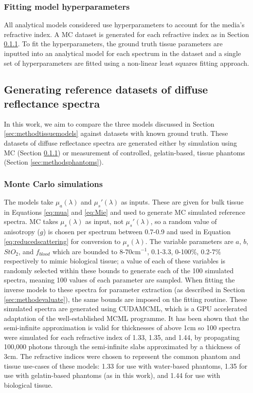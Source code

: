 \subsubsection{Fitting model hyperparameters}
All analytical models considered use hyperparameters to account for the media's refractive index. A MC dataset is generated for each refractive index as in Section \ref{sec:methodsMC}. To fit the hyperparameters, the ground truth tissue parameters are inputted into an analytical model for each spectrum in the dataset and a single set of hyperparameters are fitted using a non-linear least squares fitting approach.

\subsection{Generating reference datasets of diffuse reflectance spectra}\label{sec:methodreference}
In this work, we aim to compare the three models discussed in Section \ref{sec:methodtissuemodels} against datasets with known ground truth. These datasets of diffuse reflectance spectra are generated either by simulation using MC (Section \ref{sec:methodsMC}) or measurement of controlled, gelatin-based, tissue phantoms (Section \ref{sec:methodsphantoms}).

\subsubsection{Monte Carlo simulations}\label{sec:methodsMC}
The models take $\mu_a(\lambda)$ and $\mu_s'(\lambda)$ as inputs. These are given for bulk tissue in Equations \eqref{eq:mua} and \eqref{eq:Mie} and used to generate MC simulated reference spectra. MC takes $\mu_s(\lambda)$ as input, not $\mu_s'(\lambda)$, so a random value of anisotropy ($g$) is chosen per spectrum between 0.7-0.9\cite{Yudovsky2009} and used in Equation \eqref{eq:reducedscattering} for conversion to $\mu_s(\lambda)$. The variable parameters are $a$, $b$, $StO_2$, and $f_{blood}$ which are bounded to 8-70cm\textrm{$^{-1}$}, 0.1-3.3, 0-100\%, 0.2-7\% respectively to mimic biological tissue\cite{Yudovsky2009, Jacques2013}; a value of each of these variables is randomly selected within these bounds to generate each of the 100 simulated spectra, meaning 100 values of each parameter are sampled. When fitting the inverse models to these spectra for parameter extraction (as described in Section \ref{sec:methodevaluate}), the same bounds are imposed on the fitting routine. These simulated spectra are generated using CUDAMCML\cite{Alerstam2008}, which is a GPU accelerated adaptation of the well-established MCML programme\cite{Wang1995}. It has been shown that the semi-infinite approximation is valid for thicknesses of above 1cm\cite{Zhang2014} so 100 spectra were simulated for each refractive index of 1.33, 1.35, and 1.44, by propagating 100,000 photons through the semi-infinite slabs approximated by a thickness of 3cm. The refractive indices were chosen to represent the common phantom and tissue use-cases of these models: 1.33 for use with water-based phantoms, 1.35 for use with gelatin-based phantoms (as in this work), and 1.44 for use with biological tissue.

